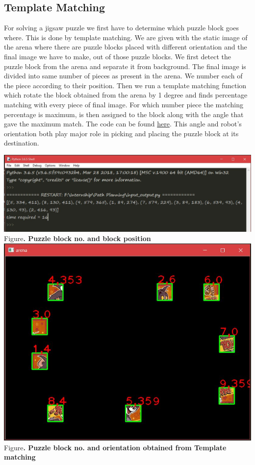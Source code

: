 \documentclass[a4paper,12pt,oneside]{book}
\begin{document}
\subsection*{Template Matching}
For solving a jigsaw puzzle we first have to determine which puzzle block goes where. This is done by template matching. We are given with the static image of the arena where there are puzzle blocks placed with different orientation and the final image we have to make, out of those puzzle blocks. We first detect the puzzle block from the arena and separate it from background. The final image is divided into same number of pieces as present in the arena. We number each of the piece according to their position. Then we run a template matching function which rotate the block obtained from the arena by 1 degree and finds percentage matching with every piece of final image. For which number piece the matching percentage is maximum, is then
assigned to the block along with the angle that gave the maximum match. The code can be found \href{https://github.com/eYSIP-2018/Jigsaw_Puzzle_Solver_using_Multiple_Robots/blob/master/Scripts/arena and puzzle block detection/input_output.py}{here}. This angle and robot's orientation both play major role in picking and placing the puzzle block at its destination.
\begin{center}
\includegraphics[scale = 0.35]{templatem.jpg}\\
\small{Figure\textbf{. Puzzle block no. and block position}}\\
\includegraphics[scale = 0.4]{template.jpg}\\
\small{Figure\textbf{. Puzzle block no. and orientation obtained from Template matching}}\\
\end{center}
\end{document}
